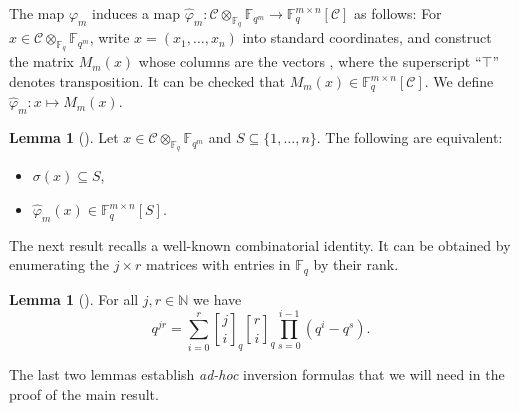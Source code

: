 \documentclass[11pt,a4paper,reqno,twoside]{article}
\theoremstyle{definition}
\newtheorem{lemma}[theorem]{Lemma}
\newcommand{\F}{\mathbb{F}}
\newcommand{\N}{\mathbb{N}}
\newcommand{\mC}{\mathcal{C}}
\newcommand{\qbinom}[2]{\genfrac{[}{]}{0pt}{}{#1}{#2}}
\begin{document}
The map $\varphi_m$ induces a map $\widehat{\varphi}_m: \mC \otimes_{\F_q} \F_{q^m} \to \F_q^{m \times n}[\mC]$ as follows: For $x \in \mC \otimes_{\F_q} \F_{q^m}$, write $x=(x_1, \ldots, x_n)$ into standard coordinates, and construct the matrix $M_m(x)$ whose columns are the vectors , where the superscript ``$\top$'' denotes transposition. It can be checked that $M_m(x) \in \F_q^{m \times n}[\mC]$. We define $\widehat{\varphi}_m : x \mapsto M_m(x)$.

\begin{lemma}[] \label{isomorphism_extension_codes}
Let $x \in \mC \otimes_{\F_q} \F_{q^m}$ and $S \subseteq \{1, \ldots, n\}$. The following are equivalent:
\begin{itemize}
    \item[1.] $\sigma(x) \subseteq S$,
    \item[2.] $\widehat{\varphi}_m(x) \in \F_q^{m \times n}[S]$.
\end{itemize}
\end{lemma}

The next result recalls a well-known combinatorial identity.  It can be obtained by enumerating the $j \times r$ matrices with entries in $\F_q$ by their rank.
 
\begin{lemma}[] \label{q^jm_inversion} 
    For all $j,r \in \N$ we have
    \[
    q^{jr} = \sum_{i=0}^r \qbinom{j}{i}_q \qbinom{r}{i}_q \prod_{s=0}^{i-1} (q^i - q^s).
    \]
\end{lemma}

The last two lemmas establish \textit{ad-hoc} inversion formulas that we will need in the proof of the main result.
\end{document}
